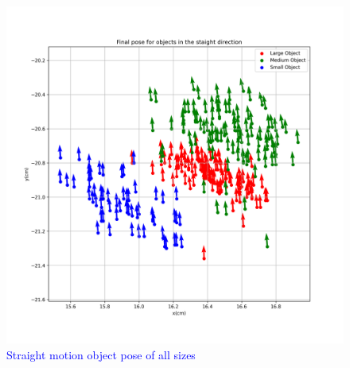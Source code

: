     
    
        \begin{figure}[H] 
            \centering \includegraphics[width=\textwidth]{"images/experiment_5/Final_pose_for_objects_of_different_size_striaght.png"}
            \caption{\textcolor{blue}{Straight motion object pose of all sizes}}
            \label{fig:exp05-straight-end-poses-all-size}
    \end{figure}
    
    
    
